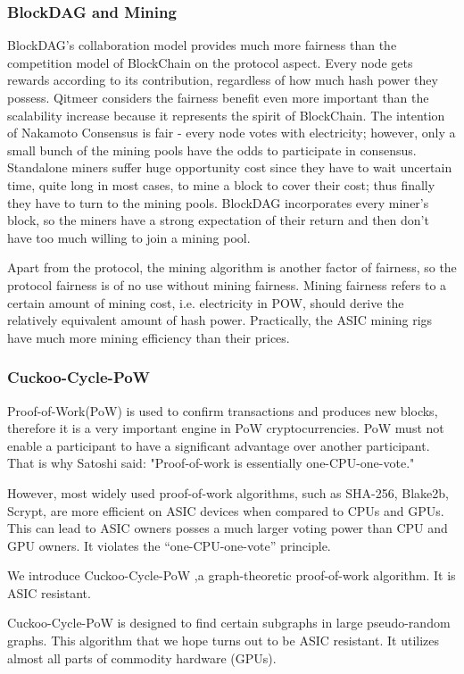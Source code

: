 \documentclass[a4paper,11pt]{article}
\begin{document}
\subsubsection{BlockDAG and Mining}
BlockDAG's collaboration model provides much more fairness than the competition model of BlockChain on the protocol aspect. Every node gets rewards according to its contribution, regardless of how much hash power they possess. Qitmeer considers the fairness benefit even more important than the scalability increase because it represents the spirit of BlockChain. The intention of Nakamoto Consensus is fair - every node votes with electricity; however, only a small bunch of the mining pools have the odds to participate in consensus. Standalone miners suffer huge opportunity cost since they have to wait uncertain time, quite long in most cases, to mine a block to cover their cost; thus finally they have to turn to the mining pools. BlockDAG incorporates every miner's block, so the miners have a strong expectation of their return and then don't have too much willing to join a mining pool.

Apart from the protocol, the mining algorithm is another factor of fairness, so the protocol fairness is of no use without mining fairness. Mining fairness refers to a certain amount of mining cost, i.e. electricity in POW, should derive the relatively equivalent amount of hash power. Practically, the ASIC mining rigs have much more mining efficiency than their prices.

\subsubsection{Cuckoo-Cycle-PoW}
Proof-of-Work(PoW) is used to confirm transactions and produces new blocks, therefore it is a very important engine in PoW cryptocurrencies. PoW must not enable a participant to have a significant advantage over another participant. That is why Satoshi said: "Proof-of-work is essentially one-CPU-one-vote."

However, most widely used proof-of-work algorithms, such as SHA-256, Blake2b, Scrypt, are more efficient on ASIC devices when compared to CPUs and GPUs. This can lead to ASIC owners posses a much larger voting power than CPU and GPU owners. It violates the “one-CPU-one-vote” principle.

We introduce Cuckoo-Cycle-PoW ,a graph-theoretic proof-of-work algorithm. It is ASIC resistant.

Cuckoo-Cycle-PoW is designed to find certain subgraphs in large pseudo-random graphs. This algorithm that we hope turns out to be ASIC resistant. It utilizes almost all parts of commodity hardware (GPUs).
\end{document}
